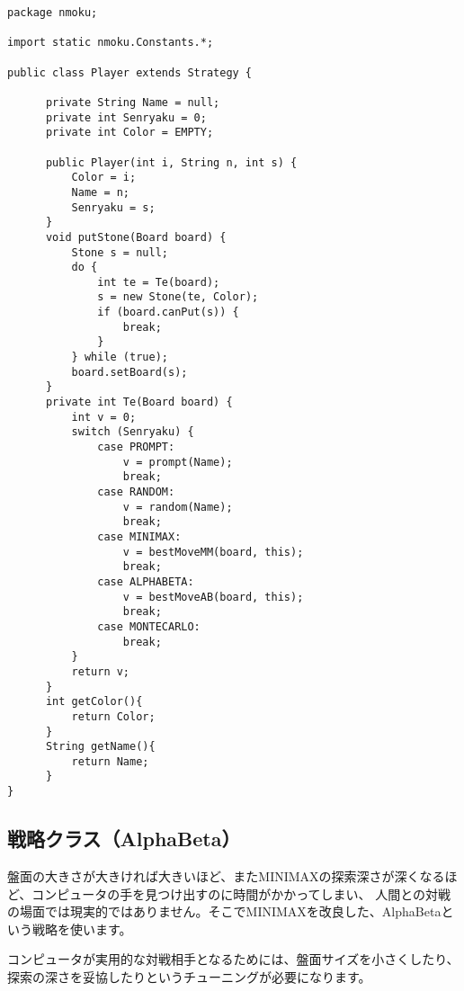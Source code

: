 \documentclass[uplatex,a4paper,11pt,oneside,openany]{jsbook}
\begin{document}
\begin{lstlisting}[caption=プレイヤークラス：N目並べ,label=prog30]
package nmoku;

import static nmoku.Constants.*;

public class Player extends Strategy {

      private String Name = null;
      private int Senryaku = 0;
      private int Color = EMPTY;

      public Player(int i, String n, int s) {
          Color = i;
          Name = n;
          Senryaku = s;
      }
      void putStone(Board board) {
          Stone s = null;
          do {
              int te = Te(board);
              s = new Stone(te, Color);
              if (board.canPut(s)) {
                  break;
              }
          } while (true);
          board.setBoard(s);
      }
      private int Te(Board board) {
          int v = 0;
          switch (Senryaku) {
              case PROMPT:
                  v = prompt(Name);
                  break;
              case RANDOM:
                  v = random(Name);
                  break;
              case MINIMAX:
                  v = bestMoveMM(board, this);
                  break;
              case ALPHABETA:
                  v = bestMoveAB(board, this);
                  break;
              case MONTECARLO:
                  break;
          }
          return v;
      }
      int getColor(){
          return Color;
      }
      String getName(){
          return Name;
      }
}
\end{lstlisting}

\subsection{戦略クラス（AlphaBeta）}

盤面の大きさが大きければ大きいほど、またMINIMAXの探索深さが深くなるほど、コンピュータの手を見つけ出すのに時間がかかってしまい、
人間との対戦の場面では現実的ではありません。そこでMINIMAXを改良した、AlphaBetaという戦略を使います。

コンピュータが実用的な対戦相手となるためには、盤面サイズを小さくしたり、探索の深さを妥協したりというチューニングが必要になります。
\end{document}
